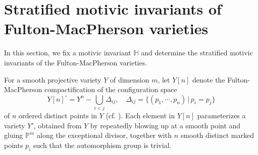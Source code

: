 \documentclass[11pt]{amsart}
\newcommand{\PP}{\mathbb{P}}
\def\HH{\mathbb{H}}
\begin{document}
\section{Stratified motivic invariants of Fulton-MacPherson varieties}

In this section, we fix a motivic invariant $\HH$ and determine the stratified motivic invariants of the Fulton-MacPherson varieties. 

For a smooth projective variety $Y$ of dimension $m$, let $Y[n]$ denote the Fulton-MacPherson compactification of the configuration space 
$$Y[n]^\circ=Y^n-\bigcup_{i<j}\Delta_{ij},\quad \Delta_{ij}=\{(p_1,\cdots,p_n)\,|\,p_i=p_j\}$$
of $n$ ordered distinct points in $Y$ (cf. \cite{FultonMacpherson1994}). 
Each element in $Y[n]$ parameterizes a variety $Y'$, obtained from $Y$ by repeatedly blowing up at a smooth point and gluing $\PP^m$ along the exceptional divisor, together with $n$ smooth distinct marked points $p_i$ such that the automorphism group is trivial. 

\begin{center}
\end{center}
\end{document}
